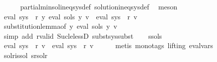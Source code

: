 \begin{isabellebody}
\ \ \ \ \isamarkupfalse%
\ partial{\isacharunderscore}{\kern0pt}min{\isacharunderscore}{\kern0pt}sol{\isacharunderscore}{\kern0pt}ineq{\isacharunderscore}{\kern0pt}sys{\isacharunderscore}{\kern0pt}def\ solution{\isacharunderscore}{\kern0pt}ineq{\isacharunderscore}{\kern0pt}sys{\isacharunderscore}{\kern0pt}def\ \isamarkupfalse%
\ meson\isanewline
\isanewline
\ \ \isamarkupfalse%
\ {\isachardoublequoteopen}eval\ {\isacharparenleft}{\kern0pt}sys\ {\isacharbang}{\kern0pt}\ r{\isacharparenright}{\kern0pt}\ {\isacharparenleft}{\kern0pt}{\isasymlambda}y{\isachardot}{\kern0pt}\ eval\ {\isacharparenleft}{\kern0pt}sols\ y{\isacharparenright}{\kern0pt}\ v{\isacharparenright}{\kern0pt}\ {\isacharequal}{\kern0pt}\ eval\ {\isacharparenleft}{\kern0pt}sys{\isacharprime}{\kern0pt}\ {\isacharbang}{\kern0pt}\ r{\isacharparenright}{\kern0pt}\ v{\isachardoublequoteclose}\isanewline
\ \ \ \ \isamarkupfalse%
\ substitution{\isacharunderscore}{\kern0pt}lemma{\isacharbrackleft}{\kern0pt}of\ {\isachardoublequoteopen}{\isasymlambda}y{\isachardot}{\kern0pt}\ eval\ {\isacharparenleft}{\kern0pt}sols\ y{\isacharparenright}{\kern0pt}\ v{\isachardoublequoteclose}{\isacharbrackright}{\kern0pt}\isanewline
\ \ \ \ \isamarkupfalse%
\ {\isacharparenleft}{\kern0pt}simp\ add{\isacharcolon}{\kern0pt}\ r{\isacharunderscore}{\kern0pt}valid\ Suc{\isacharunderscore}{\kern0pt}le{\isacharunderscore}{\kern0pt}lessD\ subst{\isacharunderscore}{\kern0pt}sys{\isacharunderscore}{\kern0pt}subst{\isacharparenright}{\kern0pt}\isanewline
\ \ \isamarkupfalse%
\ s{\isacharunderscore}{\kern0pt}sols\ \isamarkupfalse%
\ {\isachardoublequoteopen}eval\ {\isacharparenleft}{\kern0pt}sys\ {\isacharbang}{\kern0pt}\ r{\isacharparenright}{\kern0pt}\ v\ {\isacharequal}{\kern0pt}\ eval\ {\isacharparenleft}{\kern0pt}sys{\isacharprime}{\kern0pt}\ {\isacharbang}{\kern0pt}\ r{\isacharparenright}{\kern0pt}\ v{\isachardoublequoteclose}\isanewline
\ \ \ \ \isamarkupfalse%
\ {\isacharparenleft}{\kern0pt}metis\ {\isacharparenleft}{\kern0pt}mono{\isacharunderscore}{\kern0pt}tags{\isacharcomma}{\kern0pt}\ lifting{\isacharparenright}{\kern0pt}\ eval{\isacharunderscore}{\kern0pt}vars{\isacharparenright}{\kern0pt}\isanewline
\ \ \isamarkupfalse%
\ sol{\isacharunderscore}{\kern0pt}r{\isacharunderscore}{\kern0pt}is{\isacharunderscore}{\kern0pt}sol\ s{\isacharunderscore}{\kern0pt}r{\isacharunderscore}{\kern0pt}sol{\isacharunderscore}{\kern0pt}r\ \isamarkupfalse%

\end{isabellebody}
